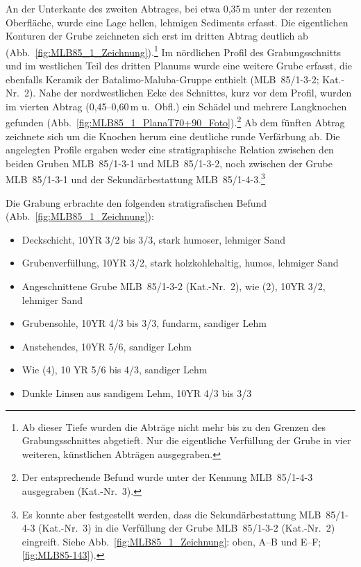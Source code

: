 An der Unterkante des zweiten Abtrages, bei etwa 0,35\,m unter der rezenten Oberfläche, wurde eine Lage hellen, lehmigen Sediments erfasst. Die eigentlichen Konturen der Grube zeichneten sich erst im dritten Abtrag deutlich ab (Abb.~\ref{fig:MLB85_1_Zeichnung}).\footnote{Ab dieser Tiefe wurden die Abträge nicht mehr bis zu den Grenzen des Grabungsschnittes abgetieft. Nur die eigentliche Verfüllung der Grube in vier weiteren, künstlichen Abträgen ausgegraben.} Im nördlichen Profil des Grabungsschnitts und im westlichen Teil des dritten Planums wurde eine weitere Grube erfasst, die ebenfalls Keramik der Batalimo-Maluba-Gruppe enthielt (MLB~85/1-3-2; Kat.-Nr.~2). Nahe der nordwestlichen Ecke des Schnittes, kurz vor dem Profil, wurden im vierten Abtrag (0,45--0,60\,m u.~Obfl.) ein Schädel und mehrere Langknochen gefunden (Abb.~\ref{fig:MLB85_1_PlanaT70+90_Foto}).\footnote{Der entsprechende Befund wurde unter der Kennung MLB~85/1-4-3 ausgegraben (Kat.-Nr.~3).} Ab dem fünften Abtrag zeichnete sich um die Knochen herum eine deutliche runde Verfärbung ab. Die angelegten Profile ergaben weder eine stratigraphische Relation zwischen den beiden Gruben MLB~85/1-3-1 und MLB~85/1-3-2, noch zwischen der Grube MLB~85/1-3-1 und der Sekundärbestattung MLB~85/1-4-3.\footnote{Es konnte aber festgestellt werden, dass die Sekundärbestattung MLB~85/1-4-3 (Kat.-Nr.~3) in die Verfüllung der Grube MLB~85/1-3-2 (Kat.-Nr.~2) eingreift. Siehe Abb.~\ref{fig:MLB85_1_Zeichnung}: oben, A--B und E--F; \ref{fig:MLB85-143}).}

\vspace{.5em}\noindent Die Grabung erbrachte den folgenden stratigrafischen Befund (Abb.~\ref{fig:MLB85_1_Zeichnung}):
\begin{itemize}[leftmargin=*, labelindent=1.5em, noitemsep, topsep=0pt]
\item [(1)] Deckschicht, 10YR 3/2 bis 3/3, stark humoser, lehmiger Sand
\item [(2)] Grubenverfüllung, 10YR 3/2, stark holzkohlehaltig, humos, lehmiger Sand
\item [(2a)] Angeschnittene Grube MLB~85/1-3-2 (Kat.-Nr.~2), wie (2), 10YR 3/2, lehmiger Sand
\item [(3)] Grubensohle, 10YR 4/3 bis 3/3, fundarm, sandiger Lehm
\item [(4)] Anstehendes, 10YR 5/6, sandiger Lehm
\item [(4a)] Wie (4), 10 YR 5/6 bis 4/3, sandiger Lehm
\item [(5)] Dunkle Linsen aus sandigem Lehm, 10YR 4/3 bis 3/3
\end{itemize}

